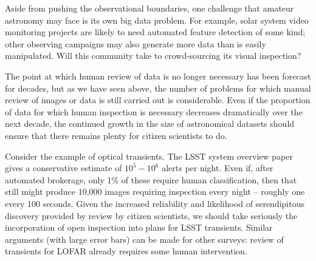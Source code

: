 \documentclass{ar2e}
\begin{document}
Aside from pushing the observational boundaries, one challenge that amateur
astronomy may face is its own big data problem.   For example, solar system
video monitoring projects are likely to need automated feature detection of some
kind; other observing campaigns may also generate more data than is easily
manipulated. Will this community take to crowd-sourcing its visual inspection?





% 

The point at which human review of data is no longer necessary has been forecast
for decades, but as we have seen above, the number of problems for which
manual review of images or data is still carried out is considerable. Even if
the proportion of data for which human inspection is necessary decreases
dramatically over the next decade, the continued growth in the size of
astronomical datasets should ensure that there remains plenty for citizen
scientists to do. 

Consider the example of optical transients. The LSST system
overview paper \citep{LSSTsystem} gives a conservative estimate of $10^5-10^6$
alerts per night. Even if, after automated brokerage, only 1\% of these require
human classification, then that still might produce 10,000 images requiring
inspection every night -- roughly one every 100 seconds. Given the increased
reliability and likelihood of serendipitous discovery provided by review by
citizen scientists, we should take seriously the incorporation of open
inspection into plans for LSST transients. Similar arguments (with large error
bars) can be made for other surveys: review of transients for LOFAR
already requires some human intervention. 
\end{document}
